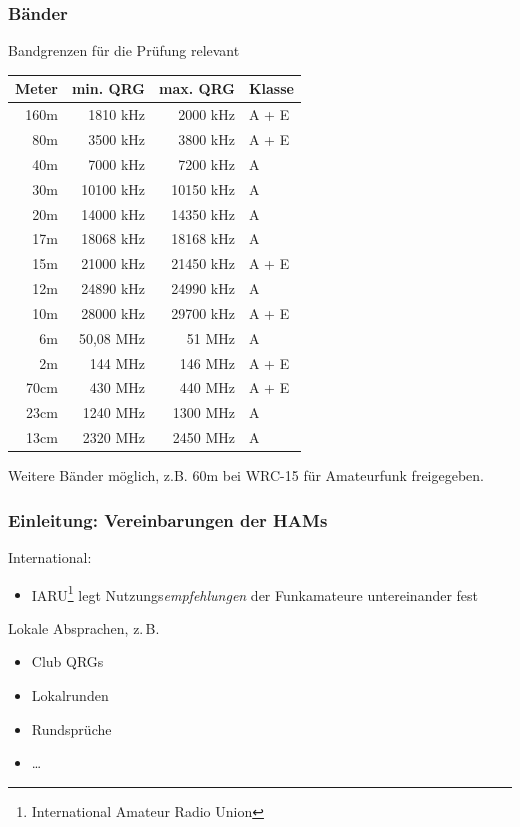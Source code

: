 \begin{frame}
  \frametitle{Bänder}
  Bandgrenzen für die Prüfung relevant

  \begin{center}
    {\footnotesize
    \begin{tabular}{r|r|r|l}\hline
      \textbf{Meter} & \textbf{min. QRG} & \textbf{max. QRG} & \textbf{Klasse} \\\hline\hline
      160m &   1810 kHz &   2000 kHz & A + E \\
      80m  &   3500 kHz &   3800 kHz & A + E \\
      40m  &   7000 kHz &   7200 kHz & A \\
      30m  &  10100 kHz &  10150 kHz & A \\
      20m  &  14000 kHz &  14350 kHz & A \\
      17m  &  18068 kHz &  18168 kHz & A \\
      15m  &  21000 kHz &  21450 kHz & A + E \\
      12m  &  24890 kHz &  24990 kHz & A \\
      10m  &  28000 kHz &  29700 kHz & A + E \\
      6m   &  50,08 MHz &     51 MHz & A \\
      2m   &    144 MHz &    146 MHz & A + E \\
      70cm &    430 MHz &    440 MHz & A + E \\
      23cm &   1240 MHz &   1300 MHz & A \\
      13cm &   2320 MHz &   2450 MHz & A \\\hline
    \end{tabular}
    }
  \end{center}

  Weitere Bänder möglich, z.B. 60m bei WRC-15 für Amateurfunk freigegeben.
\end{frame}


\begin{frame}
  \frametitle{Einleitung: Vereinbarungen der HAMs}

  International:

  \begin{itemize}
    \item IARU\footnote{International Amateur Radio Union} legt
      Nutzungs\emph{empfehlungen} der Funkamateure untereinander fest
  \end{itemize}

  Lokale Absprachen, z.\,B.

  \begin{itemize}
    \item Club QRGs
    \item Lokalrunden
    \item Rundsprüche
    \item \ldots
  \end{itemize}

\end{frame}

